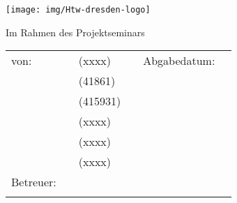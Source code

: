 \begin{titlepage}
    \thispagestyle{empty}
    \enlargethispage{35mm}
    \setlength{\headheight}{0mm}

    \sffamily



    \iftitlelogo{}
        \hspace{-1cm}\texttt{[image: img/Htw-dresden-logo]}
    \else
        {%
            \mdseries
            \Huge \MakeUppercase{\myDefUniversity}\\\vspace{0.5em}
        }
    \fi

    \vfill
    \vspace{10mm}
    \begin{center}
        \begin{huge}
            \myDefTitle{}
            \vfill
        \end{huge}
        \begin{Large}
            Im Rahmen des Projektseminars \\ 
            \myDefSeminar{}
            \vfill
        \end{Large}

    \end{center}

    \vfill
    \iftitlefinal{}
        \begin{small}
            \begin{tabularx}{\textwidth}{lllXll}
            	von: & \myDefAuthorA{} & (xxxx) & & Abgabedatum:  & \myDefDateHandIn{}\\
            	& \myDefAuthorB{} & (41861) \\
            	& \myDefAuthorC{} & (415931) \\
            	& \myDefAuthorD{} & (xxxx) \\
            	& \myDefAuthorE{} & (xxxx) \\
            	& \myDefAuthorF{} & (xxxx) \\
                Betreuer:    & \multicolumn{2}{l}{\myDefSupervisor{}} \\
                &  \multicolumn{2}{l}{\myDefChair{}} \\
            \end{tabularx}
        \end{small}
        \vspace{2em}
    \fi
    \vspace{3em}

    \normalsize

\end{titlepage}


